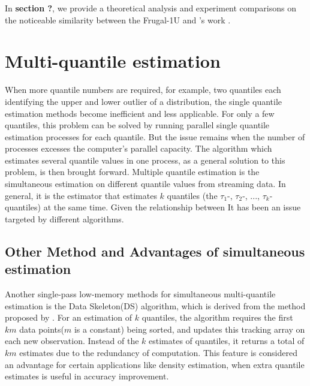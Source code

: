 In \textbf{section ?}, we provide a theoretical analysis and experiment comparisons on the noticeable similarity between the Frugal-1U and \citeauthor{yazidiQuantileEstimationDynamic2016}'s work . 


\pagebreak 


\section{Multi-quantile estimation}
\label{multiquantile}
When more quantile numbers are required, for example, two quantiles each identifying the upper and lower outlier of a distribution, the single quantile estimation methods become inefficient and less applicable.
For only a few quantiles, this problem can be solved by running parallel single quantile estimation processes for each quantile. But the issue remains when the number of processes excesses the computer's parallel capacity.
The algorithm which estimates several quantile values in one process, as a general solution to this problem, is then brought forward.
Multiple quantile estimation is the simultaneous estimation on different quantile values from streaming data. 
In general, it is the estimator that estimates $k$ quantiles (the $\tau_1$-, $\tau_2$-, $...$, $\tau_k$-quantiles) at the same time.
Given the relationship between 
It has been an issue targeted by different algorithms.
    \subsection{Other Method and Advantages of simultaneous estimation\cite{mcdermottDataSkeletonsSimultaneous2007}}

    Another single-pass low-memory methods for simultaneous multi-quantile estimation is the Data Skeleton(DS)\cite{mcdermottDataSkeletonsSimultaneous2007} algorithm, which is derived from the method proposed by \citeauthor{liechtySinglepassLowstorageArbitrary} \cite{liechtySinglepassLowstorageArbitrary}. For an estimation of $k$ quantiles, the algorithm requires the first $km$ data points($m$ is a constant) being sorted, and updates this tracking array on each new observation. Instead of the $k$ estimates of quantiles, it returns a total of $km$ estimates due to the redundancy of computation. This feature is considered an advantage for certain applications like density estimation, when extra quantile estimates is useful in accuracy improvement.



